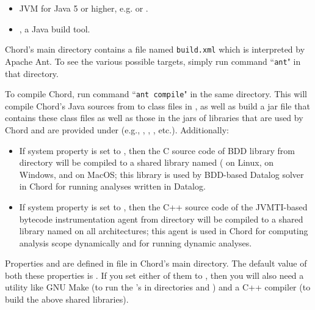 \begin{itemize}
\item
JVM for Java 5 or higher, e.g.
 or
.
\item
{}, a Java build tool.
\end{itemize}

Chord's main directory contains a file named {\tt build.xml} which is
interpreted by Apache Ant.  To see the various possible targets,
simply run command ``{\tt ant}" in that directory.

To compile Chord, run command ``{\tt ant compile}" in the same directory.
This will compile Chord's Java sources from  to class
files in , as well as build a jar file
 that contains these class files as well as those
in the jars of libraries that are used by Chord and are
provided under  (e.g., ,
, , etc.).  Additionally:

\begin{itemize}
\item

If system property  is set to , then
the C source code of BDD library
 from directory 
will be compiled to a shared library named
( on Linux,  on Windows, and
 on MacOS; this library is used by BDD-based
Datalog solver  in
Chord for running analyses written in Datalog.

\item

If system property  is set to , then
the C++ source code of the JVMTI-based bytecode instrumentation agent
from directory  will be compiled to a shared library named
 on all architectures;
this agent is used in Chord for computing analysis scope dynamically
and for running dynamic analyses.
\end{itemize}

Properties  and  are
defined in file  in Chord's main directory.
The default value of both these properties is .  If you set
either of them to , then you will also need a utility like
GNU Make (to run the 's in directories  and
) and a C++ compiler (to build the above shared libraries).

